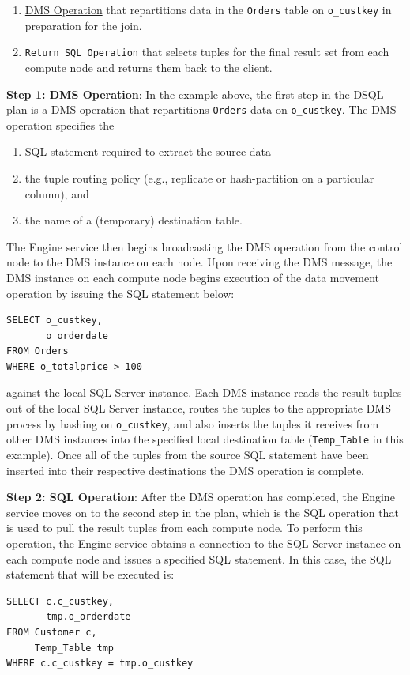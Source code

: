 \documentclass[11pt]{article}
\begin{document}
\begin{enumerate}
\item \uline{DMS Operation} that repartitions data in the \texttt{Orders} table on \texttt{o\_custkey} in preparation for the join.
\item \texttt{Return SQL Operation} that selects tuples for the final result set from each compute node and
returns them back to the client.
\end{enumerate}

\textbf{Step 1: DMS Operation}: In the example above, the first step in the DSQL plan is a DMS operation that
repartitions \texttt{Orders} data on \texttt{o\_custkey}. The DMS operation specifies the
\begin{enumerate}
\item SQL statement required to extract the source data
\item the tuple routing policy (e.g., replicate or hash-partition on a particular column), and
\item the name of a (temporary) destination table.
\end{enumerate}

The Engine service then begins broadcasting the DMS operation from the control node to the DMS
instance on each node. Upon receiving the DMS message, the DMS instance on each compute node begins
execution of the data movement operation by issuing the SQL statement below:
\begin{verbatim}
SELECT o_custkey,
       o_orderdate
FROM Orders
WHERE o_totalprice > 100
\end{verbatim}
against the local SQL Server instance. Each DMS instance reads the result tuples out of the local SQL
Server instance, routes the tuples to the appropriate DMS process by hashing on \texttt{o\_custkey}, and also
inserts the tuples it receives from other DMS instances into the specified local destination table
(\texttt{Temp\_Table} in this example). Once all of the tuples from the source SQL statement have been inserted
into their respective destinations the DMS operation is complete.

\textbf{Step 2: SQL Operation}: After the DMS operation has completed, the Engine service moves on to the
second step in the plan, which is the SQL operation that is used to pull the result tuples from each
compute node. To perform this operation, the Engine service obtains a connection to the SQL Server
instance on each compute node and issues a specified SQL statement. In this case, the SQL statement
that will be executed is:
\begin{verbatim}
SELECT c.c_custkey,
       tmp.o_orderdate
FROM Customer c,
     Temp_Table tmp
WHERE c.c_custkey = tmp.o_custkey
\end{verbatim}
\end{document}
